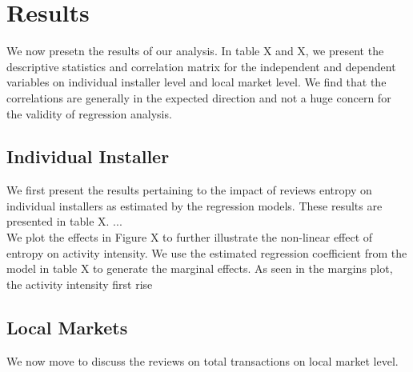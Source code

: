 \documentclass[mnsc,blindrev]{informs3} %
\begin{document}
\section{Results}
We now presetn the results of our analysis. In table X and X, we present the descriptive statistics and correlation matrix for the independent and dependent variables on individual installer level and local market level. We find that the correlations are generally in the expected direction and not a huge concern for the validity of regression analysis. 

\subsection{Individual Installer}
We first present the results pertaining to the impact of reviews entropy on individual installers as estimated by the regression models. These results are presented in table X.  ... \\
We plot the effects in Figure X to further illustrate the non-linear effect of entropy on activity intensity. We use the estimated regression coefficient from the model in table X to generate the marginal effects. As seen in the margins plot, the activity intensity first rise 

\subsection{Local Markets}
We now move to discuss the reviews on total transactions on local market level. 
\end{document}
